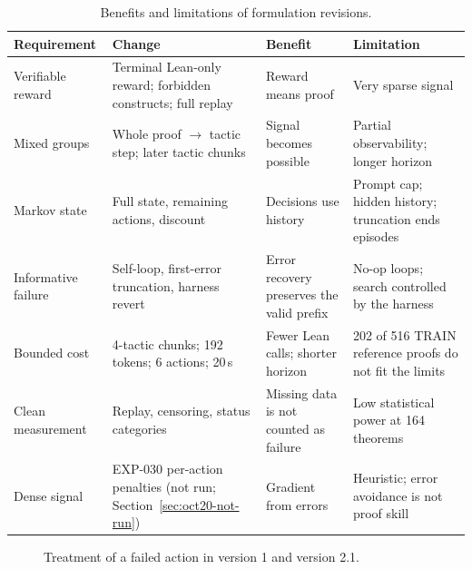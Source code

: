 \documentclass[11pt]{article}
\begin{document}
\begin{table}[!htbp]
\centering
\small
\caption{Benefits and limitations of formulation revisions.}
\label{tab:mdp-why}
\begin{tabularx}{\textwidth}{@{}P{2.2cm}P{3.8cm}P{3.3cm}Y@{}}
\toprule
Requirement & Change & Benefit & Limitation \\
\midrule
Verifiable reward & Terminal Lean-only reward; forbidden constructs; full replay & Reward means proof & Very sparse signal \\
Mixed groups & Whole proof $\rightarrow$ tactic step; later tactic chunks & Signal becomes possible & Partial observability; longer horizon \\
Markov state & Full state, remaining actions, discount & Decisions use history & Prompt cap; hidden history; truncation ends episodes \\
Informative failure & Self-loop, first-error truncation, harness revert & Error recovery preserves the valid prefix & No-op loops; search controlled by the harness \\
Bounded cost & 4-tactic chunks; 192 tokens; 6 actions; 20\,s & Fewer Lean calls; shorter horizon & 202 of 516 TRAIN reference proofs do not fit the limits \\
Clean measurement & Replay, censoring, status categories & Missing data is not counted as failure & Low statistical power at 164 theorems \\
Dense signal & EXP-030 per-action penalties (not run; Section~\ref{sec:oct20-not-run}) & Gradient from errors & Heuristic; error avoidance is not proof skill \\
\bottomrule
\end{tabularx}
\end{table}

\begin{figure}[!htbp]
\centering
{}
\caption{Treatment of a failed action in version 1 and version 2.1.}
\label{fig:v2}
\end{figure}
\end{document}

